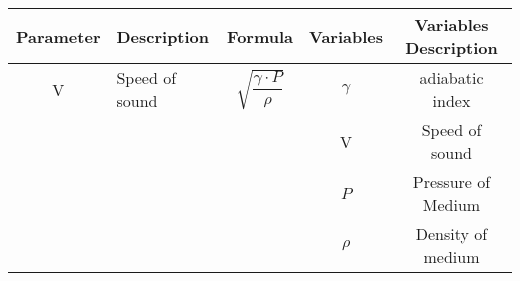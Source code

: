 \renewcommand{\arraystretch}{2}
\begin{tabular}{|c|p{2cm}|c|c|c|}
\hline 
\textbf{Parameter}  &\textbf{Description} &\textbf{Formula}& \textbf{Variables} & \textbf{Variables Description}\\ 
\hline
V & Speed of sound  & $\sqrt{ \dfrac{\gamma \cdot P}{\rho}} $ & $\gamma$&adiabatic index  \\
 \cline{4-5}
&&& V & Speed of sound\\
 \cline{4-5}
&&& $P$ & Pressure of Medium \\
\cline{4-5}
&&& $\rho$ & Density of medium\\ 
\hline
\end{tabular}
